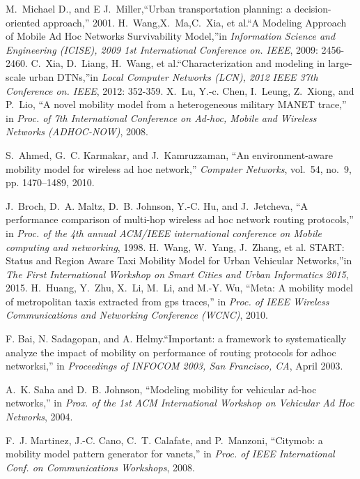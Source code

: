 \documentclass[10pt,journal,compsocconf,letterpaper]{IEEEtran}
\begin{document}
\begin{thebibliography}{11}
M.~Michael D., and E J.~Miller,``Urban transportation planning: a decision-oriented approach,'' 2001.
H.~Wang,X.~Ma,C.~Xia, et al.``A Modeling Approach of Mobile Ad Hoc Networks Survivability Model,''in \emph{Information Science and Engineering (ICISE), 2009 1st International Conference on. IEEE}, 2009: 2456-2460.
C.~Xia, D.~Liang, H.~Wang, et al.``Characterization and modeling in large-scale urban DTNs,''in \emph{Local Computer Networks (LCN), 2012 IEEE 37th Conference on. IEEE}, 2012: 352-359.
X.~Lu, Y.-c. Chen, I.~Leung, Z.~Xiong, and P.~Lio, ``A novel mobility model
  from a heterogeneous military MANET trace,'' in \emph{Proc. of 7th International Conference on Ad-hoc, Mobile and Wireless Networks (ADHOC-NOW)}, 2008.

S.~Ahmed, G.~C. Karmakar, and J.~Kamruzzaman, ``An environment-aware mobility
  model for wireless ad hoc network,'' \emph{Computer Networks}, vol.~54,
  no.~9, pp. 1470--1489, 2010.


J.~Broch, D.~A. Maltz, D.~B. Johnson, Y.-C. Hu, and J.~Jetcheva, ``A
  performance comparison of multi-hop wireless ad hoc network routing
  protocols,'' in \emph{Proc. of the 4th annual ACM/IEEE international
  conference on Mobile computing and networking}, 1998.
H.~Wang, W.~Yang, J.~Zhang, et al. START: Status and Region Aware Taxi Mobility Model for Urban Vehicular Networks,''in \emph{The First International Workshop on Smart Cities and Urban Informatics 2015}, 2015.
H.~Huang, Y.~Zhu, X.~Li, M.~Li, and M.-Y. Wu, ``Meta: A mobility model of
  metropolitan taxis extracted from gps traces,'' in \emph{Proc. of IEEE Wireless
  Communications and Networking Conference (WCNC)}, 2010.

F. Bai, N. Sadagopan, and A. Helmy.``Important: a framework to systematically analyze the impact of mobility on performance of routing protocols for adhoc networksi,'' in \emph{Proceedings of INFOCOM 2003, San Francisco, CA}, April 2003. 

A.~K. Saha and D.~B. Johnson, ``Modeling mobility for vehicular ad-hoc
  networks,'' in \emph{Prox. of the 1st ACM International Workshop on
  Vehicular Ad Hoc Networks}, 2004.

F.~J. Martinez, J.-C. Cano, C.~T. Calafate, and P.~Manzoni, ``Citymob: a
  mobility model pattern generator for vanets,'' in \emph{Proc. of IEEE International Conf. on Communications Workshops}, 2008.


\end{thebibliography}
\end{document}
